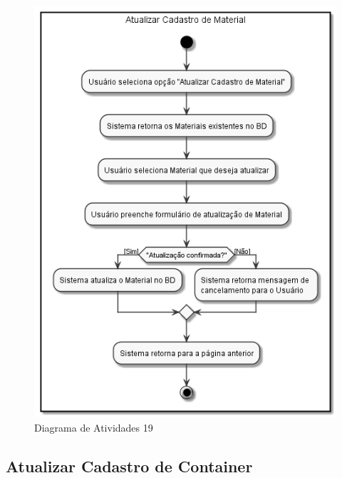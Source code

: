 \documentclass[rascunho,xindy,acronym,symbols]{fei}
\begin{document}
\begin{figure}[H]
    \centering
    \includegraphics[scale=0.6, width=400pt]{./Images/Atualizar_Cadastro_de_Material.png}
    \caption{Diagrama de Atividades 19}
    \label{fig:diag_atv19}
\end{figure}

\subsection{Atualizar Cadastro de Container}
\end{document}
